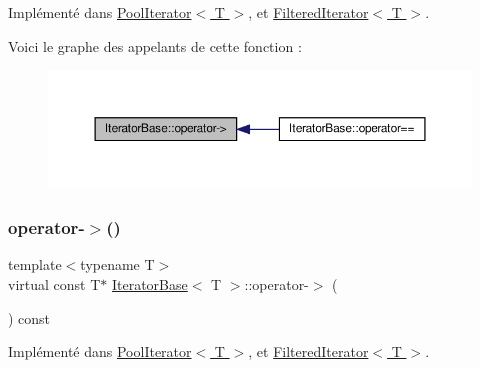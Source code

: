 Implémenté dans \hyperlink{class_pool_iterator_ae2893041831d8c29f222af7fe184fe09}{Pool\+Iterator$<$ T $>$}, et \hyperlink{class_filtered_iterator_a413726d7cc9a951d0a30eaee6cf36de1}{Filtered\+Iterator$<$ T $>$}.

Voici le graphe des appelants de cette fonction \+:
\nopagebreak
\begin{figure}[H]
\begin{center}
\leavevmode
\includegraphics[width=350pt]{class_iterator_base_aad2254f7877e4647f699ceb455e893ff_icgraph}
\end{center}
\end{figure}
\mbox{\label{class_iterator_base_a49d96fd63062ca0d7fd813517ad69f03}} 
\subsubsection{\texorpdfstring{operator-\/$>$()}{operator->()}\hspace{0.1cm}{\footnotesize\ttfamily [2/2]}}
{\footnotesize\ttfamily template$<$typename T$>$ \\
virtual const T$\ast$ \hyperlink{class_iterator_base}{Iterator\+Base}$<$ T $>$\+::operator-\/$>$ (\begin{DoxyParamCaption}{ }\end{DoxyParamCaption}) const\hspace{0.3cm}{\ttfamily [pure virtual]}}



Implémenté dans \hyperlink{class_pool_iterator_a228d6ee24cd015a7312fa9f76244994c}{Pool\+Iterator$<$ T $>$}, et \hyperlink{class_filtered_iterator_a75ea4ec86c45f496c1515e8e9832cd0f}{Filtered\+Iterator$<$ T $>$}.

\mbox{\label{class_iterator_base_a7475728422cb73f91d1c4cb4c3d07499}} 
